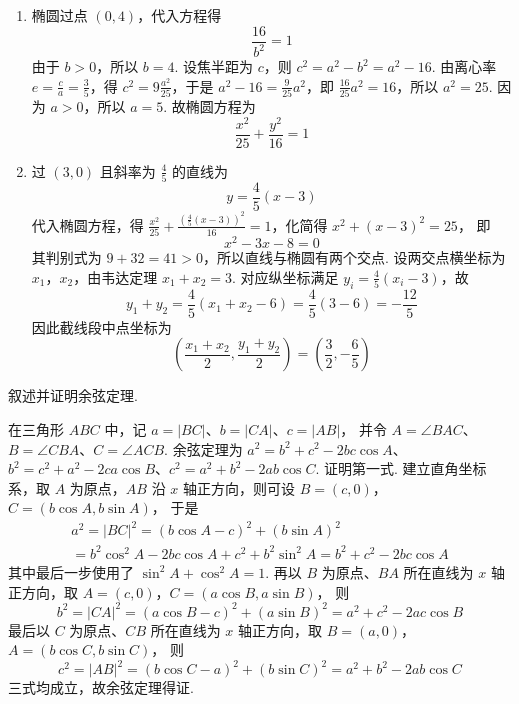 \begin{solution}
\begin{enumerate}
\item 椭圆过点 \((0,4)\)，代入方程得
\[
\frac{16}{b^2}=1
\]
由于 \(b>0\)，所以 \(b=4\). 设焦半距为 \(c\)，则 \(c^2=a^2-b^2=a^2-16\). 由离心率 \(e=\frac{c}{a}=\frac{3}{5}\)，得 \(c^2=9\frac{a^2}{25}\)，于是
\(a^2-16=\frac{9}{25}a^2\)，即 \(\frac{16}{25}a^2=16\)，所以 \(a^2=25\).
因为 \(a>0\)，所以 \(a=5\). 故椭圆方程为
\[
\frac{x^2}{25}+\frac{y^2}{16}=1
\]
\item 过 \((3,0)\) 且斜率为 \(\frac{4}{5}\) 的直线为
\[
y=\frac45(x-3)
\]
代入椭圆方程，得
\(\frac{x^2}{25}+\frac{\left(\frac45(x-3)\right)^2}{16}=1\)，化简得 \(x^2+(x-3)^2=25\)，
即
\[
x^2-3x-8=0
\]
其判别式为 \(9+32=41>0\)，所以直线与椭圆有两个交点. 设两交点横坐标为 \(x_1\)，\(x_2\)，由韦达定理 \(x_1+x_2=3\). 对应纵坐标满足 \(y_i=\frac45(x_i-3)\)，故
\[
y_1+y_2=\frac45(x_1+x_2-6)=\frac45(3-6)=-\frac{12}{5}
\]
因此截线段中点坐标为
\[
\left(\frac{x_1+x_2}{2},\frac{y_1+y_2}{2}\right)=\left(\frac32,-\frac65\right)
\]
\end{enumerate}
\end{solution}

\begin{problem}
叙述并证明余弦定理.
\end{problem}

\begin{solution}
在三角形 \(ABC\) 中，记
\(a=|BC|\)、\(b=|CA|\)、\(c=|AB|\)，
并令 \(A=\angle BAC\)、\(B=\angle CBA\)、\(C=\angle ACB\). 余弦定理为 \(a^2=b^2+c^2-2bc\cos A\)、\(b^2=c^2+a^2-2ca\cos B\)、\(c^2=a^2+b^2-2ab\cos C\).
证明第一式. 建立直角坐标系，取 \(A\) 为原点，\(AB\) 沿 \(x\) 轴正方向，则可设
\(B=(c,0)\)，\(C=(b\cos A,b\sin A)\)，
于是
\[
\begin{gathered}
a^2=|BC|^2=(b\cos A-c)^2+(b\sin A)^2\\
=b^2\cos^2A-2bc\cos A+c^2+b^2\sin^2A=b^2+c^2-2bc\cos A
\end{gathered}
\]
其中最后一步使用了 \(\sin^2A+\cos^2A=1\). 再以 \(B\) 为原点、\(BA\) 所在直线为 \(x\) 轴正方向，取
\(A=(c,0)\)，\(C=(a\cos B,a\sin B)\)，
则
\[
b^2=|CA|^2=(a\cos B-c)^2+(a\sin B)^2=a^2+c^2-2ac\cos B
\]
最后以 \(C\) 为原点、\(CB\) 所在直线为 \(x\) 轴正方向，取
\(B=(a,0)\)，\(A=(b\cos C,b\sin C)\)，
则
\[
c^2=|AB|^2=(b\cos C-a)^2+(b\sin C)^2=a^2+b^2-2ab\cos C
\]
三式均成立，故余弦定理得证.
\end{solution}

